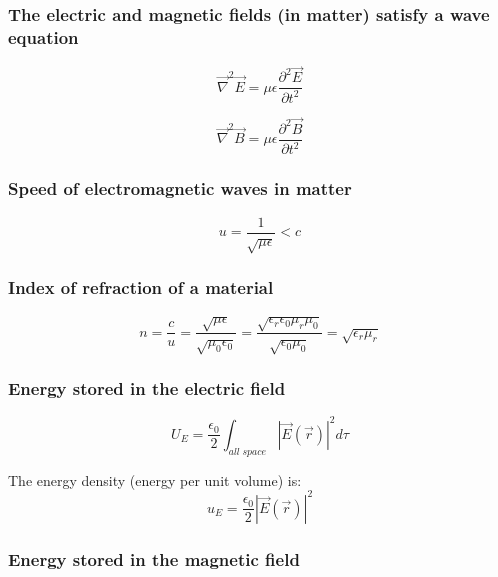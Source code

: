 \documentclass[english,11pt]{article}
\begin{document}
\subsubsection*{\bf The electric and magnetic fields (in matter) satisfy a wave equation}

\begin{equation*}
  \vec{\nabla}^{2} \vec{E} = \mu \epsilon \frac{\partial^{2} \vec{E}}{\partial t^{2}}
\end{equation*}

\begin{equation*}
  \vec{\nabla}^{2} \vec{B} = \mu \epsilon \frac{\partial^{2} \vec{B}}{\partial t^{2}}
\end{equation*}

\subsubsection*{\bf Speed of electromagnetic waves in matter}
\begin{equation*}
  u = \frac{1}{\sqrt{\mu \epsilon}} < c
\end{equation*}


\subsubsection*{\bf Index of refraction of a material}
\begin{equation*}
  n = \frac{c}{u} =
    \frac{\sqrt{\mu \epsilon}}{\sqrt{\mu_{0} \epsilon_{0}}} =
    \frac{\sqrt{\epsilon_r \epsilon_0 \mu_r
        \mu_0}}{\sqrt{\epsilon_0 \mu_0}} = \sqrt{\epsilon_r \mu_r}
\end{equation*}


\subsubsection*{\bf Energy stored in the electric field}

\begin{equation*}
   U_{E} = \frac{\epsilon_0}{2} \int_{all\;space} |\vec{E}(\vec{r})|^2  d\tau
\end{equation*}

The energy density (energy per unit volume) is:
\begin{equation*}
  u_{E} = \frac{\epsilon_0}{2} |\vec{E}(\vec{r})|^2
\end{equation*}

\subsubsection*{\bf Energy stored in the magnetic field}
\end{document}
